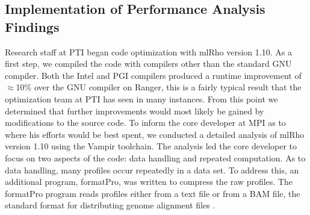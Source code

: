 \documentclass{sig-alternate}
\begin{document}
\subsection{Implementation of  Performance Analysis Findings}
Research staff at PTI began code optimization with mlRho version 1.10. As a first step, we compiled
the code with compilers other than the standard GNU compiler. Both the
Intel and PGI compilers produced a runtime improvement of $\approx$10\% over the GNU compiler on Ranger, this
is a fairly typical result that the optimization team at PTI has seen in many instances. From this point we
determined that further improvements would most likely be gained by modifications to the source code. To
inform the core developer at MPI as to
where his efforts would be best spent, we conducted a detailed analysis of mlRho version 1.10 using
the Vampir toolchain. The analysis led the core developer to focus on two aspects of the code: data handling
and repeated computation. As to data handling, many profiles occur repeatedly in a data set. To address this,
an additional program, formatPro, was written to compress the raw profiles. The formatPro program reads profiles either from a text
file or from a BAM file, the standard format for distributing genome alignment files \citep{li09:seq}. 
\end{document}
